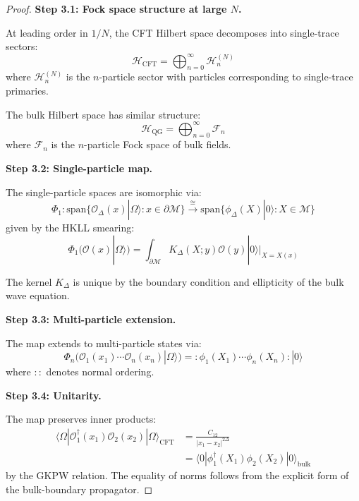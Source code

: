 \documentclass[12pt,a4paper]{article}
\begin{document}
\begin{proof}
\textbf{Step 3.1: Fock space structure at large $N$.}

At leading order in $1/N$, the CFT Hilbert space decomposes into single-trace sectors:
\begin{equation}
\mathcal{H}_{\text{CFT}} = \bigoplus_{n=0}^{\infty} \mathcal{H}_n^{(N)}
\end{equation}
where $\mathcal{H}_n^{(N)}$ is the $n$-particle sector with particles corresponding to single-trace primaries.

The bulk Hilbert space has similar structure:
\begin{equation}
\mathcal{H}_{\text{QG}} = \bigoplus_{n=0}^{\infty} \mathcal{F}_n
\end{equation}
where $\mathcal{F}_n$ is the $n$-particle Fock space of bulk fields.

\textbf{Step 3.2: Single-particle map.}

The single-particle spaces are isomorphic via:
\begin{equation}
\Phi_1: \text{span}\{\mathcal{O}_\Delta(x)|\Omega\rangle : x \in \partial\mathcal{M}\} \xrightarrow{\cong} \text{span}\{\phi_\Delta(X)|0\rangle : X \in \mathcal{M}\}
\end{equation}
given by the HKLL smearing:
\begin{equation}
\Phi_1(\mathcal{O}(x)|\Omega\rangle) = \int_{\partial\mathcal{M}} K_\Delta(X; y)\mathcal{O}(y)|0\rangle \Big|_{X=X(x)}
\end{equation}

The kernel $K_\Delta$ is unique by the boundary condition and ellipticity of the bulk wave equation.

\textbf{Step 3.3: Multi-particle extension.}

The map extends to multi-particle states via:
\begin{equation}
\Phi_n(\mathcal{O}_1(x_1) \cdots \mathcal{O}_n(x_n)|\Omega\rangle) = :\phi_1(X_1) \cdots \phi_n(X_n):|0\rangle
\end{equation}
where $::$ denotes normal ordering.

\textbf{Step 3.4: Unitarity.}

The map preserves inner products:
\begin{align}
\langle\Omega|\mathcal{O}_1^\dagger(x_1)\mathcal{O}_2(x_2)|\Omega\rangle_{\text{CFT}} &= \frac{C_{12}}{|x_1 - x_2|^{2\Delta}} \\
&= \langle 0|\phi_1^\dagger(X_1)\phi_2(X_2)|0\rangle_{\text{bulk}}
\end{align}
by the GKPW relation. The equality of norms follows from the explicit form of the bulk-boundary propagator.


\end{proof}
\end{document}

